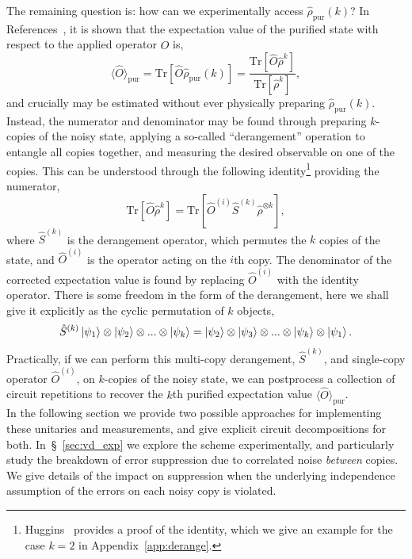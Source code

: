 The remaining question is: how can we experimentally access $\hat\rho_\mathrm{pur}(k)$? In References~\cite{koczor_exponential_2021,huggins_virtual_2021}, it is shown that the expectation value of the purified state with respect to the applied operator $\hat O$ is,
\begin{equation}
    \label{eqn:pure_observable}
    \langle\hat{O}\rangle_\mathrm{pur}=\mathrm{Tr}[\hat{O}\hat\rho_\mathrm{pur}(k)]=\frac{\mathrm{Tr}[\hat{O}\hat\rho^k]}{\mathrm{Tr}[\hat\rho^k]},
\end{equation}
and crucially may be estimated without ever physically preparing $\hat\rho_\mathrm{pur}(k)$.  
Instead, the numerator and denominator may be found through preparing $k$-copies
of the noisy state, applying a so-called ``derangement'' operation to entangle all copies
together, and measuring the desired observable on one of the copies. This can be
understood through the following identity\footnote{Huggins~\cite{huggins_virtual_2021} provides a proof of the identity, which we give an example for the case $k=2$ in Appendix~\ref{app:derange}.} providing the numerator,
\begin{equation}
    \label{eqn:vd_identity}
    \mathrm{Tr}[\hat{O}\hat\rho^k]=\mathrm{Tr}[\hat{O}^{(i)}\hat S^{(k)}\hat\rho^{\otimes k}],
\end{equation}
where $\hat S^{(k)}$ is the derangement operator, which permutes the $k$ copies of the state, and $\hat{O}^{(i)}$ is the operator acting on the $i$th copy. 
The denominator of the corrected expectation value is found by replacing $\hat{O}^{(i)}$ with the identity operator.
There is some freedom in the form of the derangement, here we shall give it explicitly as the cyclic permutation of $k$ objects,
\begin{equation}
    \label{eqn:derange}
    \hat S^{(k)}\ket{\psi_1}\otimes\ket{\psi_2}\otimes...\otimes\ket{\psi_k}=\ket{\psi_2}\otimes\ket{\psi_3}\otimes...\otimes\ket{\psi_k}\otimes\ket{\psi_1}.
\end{equation}
Practically, if we can perform this multi-copy derangement, $\hat S^{(k)}$, and single-copy operator $\hat{O}^{(i)}$, on $k$-copies of the noisy state, we can postprocess a collection of circuit repetitions to recover the $k$th purified expectation value $\langle\hat O \rangle_\mathrm{pur}$.\\

In the following section we provide two possible approaches for implementing these unitaries and measurements, and give explicit circuit decompositions for both.
In~\S~\ref{sec:vd_exp} we explore the scheme experimentally, and particularly study the breakdown of error suppression due to correlated noise \emph{between} copies. We give details of the impact on suppression when the underlying independence assumption of the errors on each noisy copy is violated.

